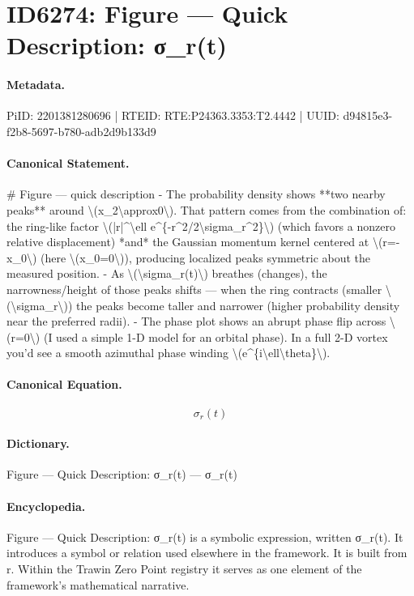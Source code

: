 \section*{ID6274: Figure — Quick Description: σ\_r(t)}
\paragraph{Metadata.}
PiID: 2201381280696 | RTEID: RTE:P24363.3353:T2.4442 | UUID: d94815e3-f2b8-5697-b780-adb2d9b133d9

\paragraph{Canonical Statement.}
\# Figure — quick description - The probability density shows **two nearby peaks** around \textbackslash{}(x\_2\textbackslash{}approx0\textbackslash{}). That pattern comes from the combination of: the ring-like factor \textbackslash{}(|r|\textasciicircum{}\textbackslash{}ell e\textasciicircum{}\{-r\textasciicircum{}2/2\textbackslash{}sigma\_r\textasciicircum{}2\}\textbackslash{}) (which favors a nonzero relative displacement) *and* the Gaussian momentum kernel centered at \textbackslash{}(r=-x\_0\textbackslash{}) (here \textbackslash{}(x\_0=0\textbackslash{})), producing localized peaks symmetric about the measured position. - As \textbackslash{}(\textbackslash{}sigma\_r(t)\textbackslash{}) breathes (changes), the narrowness/height of those peaks shifts — when the ring contracts (smaller \textbackslash{}(\textbackslash{}sigma\_r\textbackslash{})) the peaks become taller and narrower (higher probability density near the preferred radii). - The phase plot shows an abrupt phase flip across \textbackslash{}(r=0\textbackslash{}) (I used a simple 1-D model for an orbital phase). In a full 2-D vortex you’d see a smooth azimuthal phase winding \textbackslash{}(e\textasciicircum{}\{i\textbackslash{}ell\textbackslash{}theta\}\textbackslash{}).

\paragraph{Canonical Equation.}
\[
\sigma_r(t)
\]

\paragraph{Dictionary.}
Figure — Quick Description: σ\_r(t) — σ\_r(t)

\paragraph{Encyclopedia.}
Figure — Quick Description: σ\_r(t) is a symbolic expression, written σ\_r(t). It introduces a symbol or relation used elsewhere in the framework. It is built from r. Within the Trawin Zero Point registry it serves as one element of the framework's mathematical narrative.
